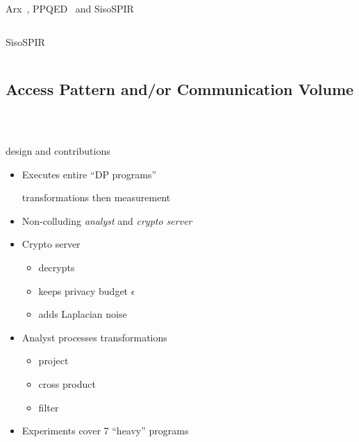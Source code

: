 \begin{frame}{Arx~\cite{arx}, PPQED~\cite{ppqed} and SisoSPIR~\cite{sisospir}}
\begin{columns}[T,onlytextwidth]
{\begin{block}{SisoSPIR~\cite{sisospir}}
						\end{block}

					}

			\end{columns}

		\end{frame}

	\subsection{Access Pattern and/or Communication Volume}

		\begin{frame}{\crypte~\cite{crypte}}

			\begin{columns}[T,onlytextwidth]

					\begin{block}{\crypte{} design and contributions}

						\begin{itemize}
							\item Executes entire ``DP programs'' \\
								\begin{small}
									transformations then measurement
								\end{small}
							\item Non-colluding \emph{analyst} and \emph{crypto server}
							\item Crypto server
								\begin{small}
									\begin{itemize}
										\item decrypts
										\item keeps privacy budget $\epsilon$
										\item adds Laplacian noise
									\end{itemize}
								\end{small}
							\item Analyst processes transformations
								\begin{small}
									\begin{itemize}
										\item project
										\item cross product
										\item filter
									\end{itemize}
								\end{small}
							\item Experiments cover 7 ``heavy'' programs
						\end{itemize}


\end{block}
\end{columns}
\end{frame}
